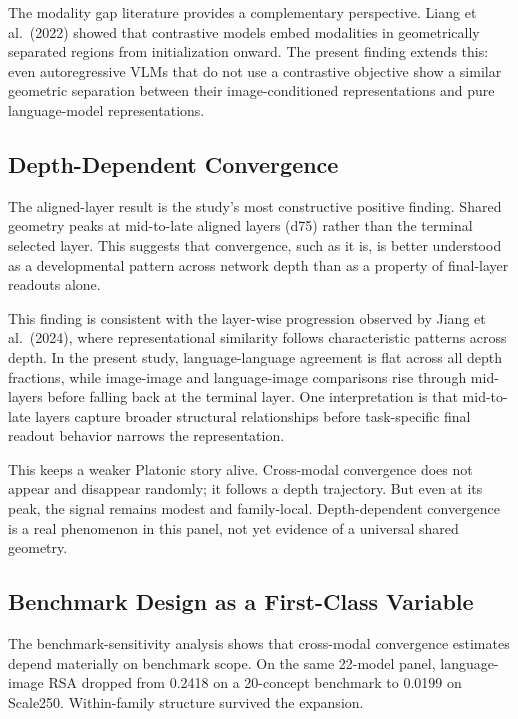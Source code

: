 \documentclass[10pt]{article}
\begin{document}
The modality gap literature provides a complementary perspective. Liang
et al.~(2022) showed that contrastive models embed modalities in
geometrically separated regions from initialization onward. The present
finding extends this: even autoregressive VLMs that do not use a
contrastive objective show a similar geometric separation between their
image-conditioned representations and pure language-model
representations.

\subsection{Depth-Dependent
Convergence}\label{depth-dependent-convergence}

The aligned-layer result is the study's most constructive positive
finding. Shared geometry peaks at mid-to-late aligned layers (d75)
rather than the terminal selected layer. This suggests that convergence,
such as it is, is better understood as a developmental pattern across
network depth than as a property of final-layer readouts alone.

This finding is consistent with the layer-wise progression observed by
Jiang et al.~(2024), where representational similarity follows
characteristic patterns across depth. In the present study,
language-language agreement is flat across all depth fractions, while
image-image and language-image comparisons rise through mid-layers
before falling back at the terminal layer. One interpretation is that
mid-to-late layers capture broader structural relationships before
task-specific final readout behavior narrows the representation.

This keeps a weaker Platonic story alive. Cross-modal convergence does
not appear and disappear randomly; it follows a depth trajectory. But
even at its peak, the signal remains modest and family-local.
Depth-dependent convergence is a real phenomenon in this panel, not yet
evidence of a universal shared geometry.

\subsection{Benchmark Design as a First-Class
Variable}\label{benchmark-design-as-a-first-class-variable}

The benchmark-sensitivity analysis shows that cross-modal convergence
estimates depend materially on benchmark scope. On the same 22-model
panel, language-image RSA dropped from 0.2418 on a 20-concept benchmark
to 0.0199 on Scale250. Within-family structure survived the expansion.
\end{document}
